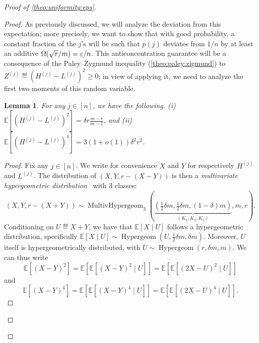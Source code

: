 \documentclass[11pt]{article}
\newtheorem{lemma}[lem]{Lemma}
\theoremstyle{remark}   	\newtheorem{remark}[theorem]{Remark}
\theoremstyle{definition}   	\newaliascnt{defn}{theorem}
\newenvironment{proofof}[1]{\begin{proof}[Proof of {#1}]}{\end{proof}}
\newcommand{\eps}{\ensuremath{\varepsilon}\xspace}
\newcommand{\bigOmega}[1]{{\Omega\mleft( #1 \mright)}}
\newcommand{\expect}[1]{\mathbb{E}\!\left[#1\right]}
\begin{document}
\begin{proofof}{\autoref{theo:uniformity:eps}}
\begin{proof}
As previously discussed, we will analyze the deviation from this expectation; more precisely, we want to show that with good probability, a constant fraction of the $j$'s will be such that $p(j)$ deviates from ${1}/{n}$ by at least an additive $\bigOmega{{\sqrt{r}}/{m}} = {\eps}/{n}$. This anticoncentration guarantee will be a consequence of the Paley--Zygmund inequality (\autoref{theo:paley:zigmund}) to $Z^{(j)}\eqdef (H^{(j)} - L^{(j)})^2 \geq 0$; in view of applying it, we need to analyze the first two moments of this random variable.
  \begin{lemma}\label{lemma:eps:uniformity:soundness:anticoncentration}
    For any $j\in[n]$, we have the following. (i) $\expect{(H^{(j)} - L^{(j)})^2} = \delta r \frac{m-r}{m-1}$, and (ii)~$\expect{(H^{(j)} - L^{(j)})^4} = 3(1+o(1)) \delta^2 r^2$.
  \end{lemma}
  \begin{proof}
Fix any $j\in[n]$. We write for convenience $X$ and $Y$ for respectively $H^{(j)}$ and $L^{(j)}$. The distribution of $(X,Y,r-(X-Y))$ is then a \emph{multivariate hypergeometric distribution}~\cite{wiki:hypergeom} with $3$ classes:
\[
(X,Y,r-(X+Y))\sim \operatorname{MultivHypergeom}_3(\underbrace{(\tfrac{1}{2}\delta m,\tfrac{1}{2}\delta m,(1-\delta) m)}_{(K_1,K_2,K_3)}, m, r).
\]
Conditioning on $U\eqdef X+Y$, we have that $\expect{X\mid U}$ follows a hypergeometric distribution, specifically $\expect{X\mid U} \sim \operatorname{Hypergeom}(U, \frac{1}{2} \delta m, \delta m)$. Moreover, $U$ itself is hypergeometrically distributed, with
$U \sim \operatorname{Hypergeom}(r, \delta m, m)$. We can thus write
\[
\expect{(X-Y)^2} = \expect{ \expect{(X-Y)^2\mid U }} = \expect{\expect{(2X-U)^2\mid U }}
\]
and
\[
\expect{(X-Y)^4} = \expect{ \expect{(X-Y)^4\mid U }} = \expect{\expect{(2X-U)^4\mid U }}.
\]


\end{proof}
\end{proof}
\end{proofof}
\end{document}

